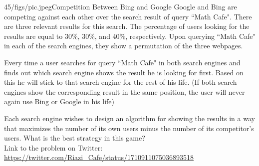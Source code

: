 \begin{problem}{45/figs/pic.jpeg}{Competition Between Bing and Google}
	Google and Bing are competing against each other over the search result of query  ``Math Cafe". There are three relevant results for this search. The percentage of users looking for the results are equal to 30\%, 30\%, and 40\%, respectively. Upon querying ``Math Cafe" in each of the search engines, they show a permutation of the three webpages.
	
Every time a user searches for query ``Math Cafe" in both search engines and finds out which search engine shows the result he is looking for first. Based on this he will stick to that search engine for the rest of his life. (If both search engines show the corresponding result in the same position, the user will never again use Bing or Google in his life)
	
Each search engine wishes to design an algorithm for showing the results in a way that maximizes the number of its own users minus the number of its competitor's users. What is the best strategy in this game?\\[0.2cm]
	
Link to the problem on Twitter:  \url{https://twitter.com/Riazi_Cafe/status/1710911075036893518}
\end{problem}

